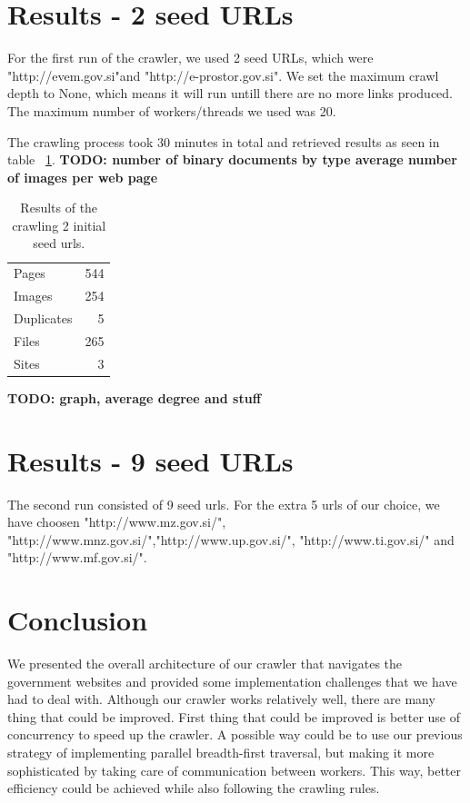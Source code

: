 \documentclass[9pt]{IEEEtran}
\begin{document}
\section{Results - 2 seed URLs}
For the first run of the crawler, we used 2 seed URLs, which were "http://evem.gov.si"and "http://e-prostor.gov.si". We set the maximum crawl depth to None, which means it will run untill there are no more links produced. The maximum number of workers/threads we used was 20.

The crawling process took 30 minutes in total and retrieved results as seen in table ~\ref{tab:results2}.
\textbf{TODO: number of binary documents by type
average number of images per web page}

\begin{table}[H]
    \begin{center}
    \caption{Results of the crawling 2 initial seed urls.}
        \begin{tabular}{ l | r }
        Pages & 544 \\
        Images & 254 \\
        Duplicates & 5 \\
        Files & 265 \\
        Sites & 3
        \end{tabular}
    \label{tab:results2}
    \end{center}
\end{table}


\textbf{TODO: graph, average degree and stuff}
\section{Results - 9 seed URLs}
The second run consisted of 9 seed urls. For the extra 5 urls of our choice, we have choosen "http://www.mz.gov.si/", "http://www.mnz.gov.si/","http://www.up.gov.si/", "http://www.ti.gov.si/" and "http://www.mf.gov.si/". 

\section{Conclusion}
We presented the overall architecture of our crawler that navigates the government websites and provided some implementation challenges that we have had to deal with.
Although our crawler works relatively well, there are many thing that could be improved.
First thing that could be improved is better use of concurrency to speed up the crawler.
A possible way could be to use our previous strategy of implementing parallel breadth-first traversal, but making it more sophisticated by taking care of communication between workers.
This way, better efficiency could be achieved while also following the crawling rules.
\end{document}
